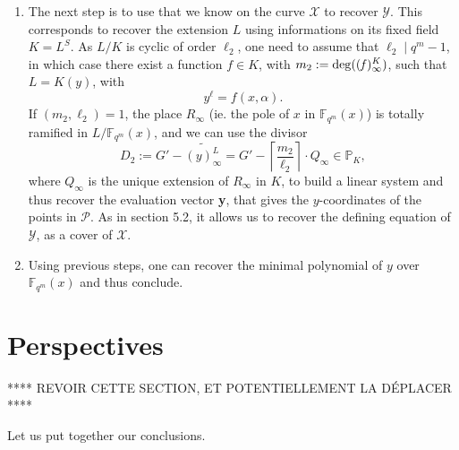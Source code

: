 \documentclass[10pt]{article}
\newcommand{\s}{\vspace{0.3cm}}
\newcommand{\cd}{\cdot}
\newcommand{\fqm}{\mathbb{F}_{q^m}}
\newcommand{\X}{\mathcal{X}}
\newcommand{\Y}{\mathcal{Y}}
\newcommand{\PR}{\mathcal{P}}
\begin{document}
\begin{enumerate}
\item The next step is to use that we know on the curve $\X$ to recover $\Y$. This corresponds to recover the extension $L$ using informations on its fixed field $K=L^S$. As $L/K$ is cyclic of order $\ell_2$, one need to assume that $\ell_2 \mid q^m-1$, in which case there exist a function $f \in K$, with $m_2:= \rm{deg}\it ((f)^K_{\infty})$, such that $L=K(y)$, with
\[y^{\ell} = f(x,\alpha).\]   
If $(m_2,\ell_2)=1$, the place $R_{\infty}$ (ie. the pole of $x$ in $\fqm(x)$) is totally ramified in $L/\fqm(x)$, and we can use the divisor 
\[D_2 := G' - \widetilde{(y)^L_{\infty}} = G' - \left\lceil\frac{m_2}{\ell_2}\right\rceil \cd Q_{\infty} \in \mathbb{P}_{K},\]
where $Q_{\infty}$ is the unique extension of $R_{\infty}$ in $K$, to build a linear system and thus recover the evaluation vector \textbf{y}, that gives the $y$-coordinates of the points in $\PR$. As in section 5.2, it allows us to recover the defining equation of $\Y$, as a cover of $\X$.

\item Using previous steps, one can recover the minimal polynomial of $y$ over $\fqm(x)$ and thus conclude.
\end{enumerate}

\s

\section{Perspectives}

\s

**** REVOIR CETTE SECTION, ET POTENTIELLEMENT LA DÉPLACER ****

\s

Let us put together our conclusions.
\end{document}
